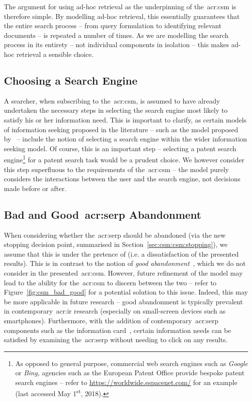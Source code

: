 The argument for using ad-hoc retrieval as the underpinning of the~\gls{acr:csm} is therefore simple. By modelling ad-hoc retrieval, this essentially guarantees that the entire search process -- from query formulation to identifying relevant documents -- is repeated a number of times. As we are modelling the search process in its entirety -- not individual components in isolation -- this makes ad-hoc retrieval a sensible choice.

\subsection{Choosing a Search Engine} A searcher, when subscribing to the~\gls{acr:csm}, is assumed to have already undertaken the necessary steps in selecting the search engine most likely to satisfy his or her information need. This is important to clarify, as certain models of information seeking proposed in the literature -- such as the model proposed by~\cite{thomas2014modelling_behaviour} -- include the notion of selecting a search engine within the wider information seeking model. Of course, this is an important step -- selecting a patent search engine\footnote{As opposed to general purpose, commercial web search engines such as \emph{Google} or \emph{Bing,} agencies such as the European Patent Office provide bespoke patent search engines -- refer to \url{https://worldwide.espacenet.com/} for an example (last accessed May 1\textsuperscript{st}, 2018).} for a patent search task would be a prudent choice. We however consider this step superfluous to the requirements of the~\gls{acr:csm} -- the model purely considers the interactions between the user and the search engine, not decisions made before or after.

\subsection{Bad and Good~\gls{acr:serp} Abandonment} When considering whether the~\gls{acr:serp} should be abandoned (via the new stopping decision point, summarised in Section~\ref{sec:csm:csm:stopping}), we assume that this is under the pretence of  (i.e. a dissatisfaction of the presented results). This is in contrast to the notion of \emph{good abandonment}~\citep{khabsa2016good_abandonment}, which we do not consider in the presented~\gls{acr:csm}. However, future refinement of the model may lead to the ability for the~\gls{acr:csm} to discern between the two -- refer to Figure~\ref{fig:csm_bad_good} for a potential solution to this issue. Indeed, this may be more applicable in future research -- good abandonment is typically prevalent in contemporary~\gls{acr:ir} research (especially on small-screen devices such as smartphones). Furthermore, with the addition of contemporary~\gls{acr:serp} components such as the information card~\citep{bota2016information_cards}, certain information needs can be satisfied by examining the~\gls{acr:serp} without needing to click on any results.

